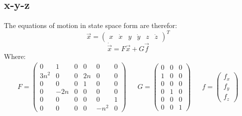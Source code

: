 \documentclass[11pt, a4paper]{article}
\begin{document}
\subsection{x-y-z}
The equations of motion in state space form are therefor:
\begin{equation}
    \vec{x} = \begin{pmatrix}
        x & \dot{x} & y & \dot{y} & z & \dot{z}
    \end{pmatrix}^T
\end{equation}
\begin{equation}
    \dot{\vec{x}}=F\vec{x}+G\vec{f}
\end{equation}
Where:
\begin{equation}
    \begin{matrix}
        F=\begin{pmatrix}
            0 & 1 & 0 & 0 & 0 & 0 \\
            3n^2 & 0 & 0 & 2n & 0 & 0 \\
            0 & 0 & 0 & 1 & 0 & 0 \\
            0 & -2n & 0 & 0 & 0 & 0 \\
            0 & 0 & 0 & 0 & 0 & 1 \\
            0 & 0 & 0 & 0 & -n^2 & 0 
        \end{pmatrix} && G=\begin{pmatrix}
            0 & 0 & 0\\
            1 & 0 & 0\\
            0 & 0 & 0\\
            0 & 1 & 0\\
            0 & 0 & 0\\
            0 & 0 & 1
        \end{pmatrix} && f=\begin{pmatrix}
            f_x\\f_y\\f_z
        \end{pmatrix}
    \end{matrix}
\end{equation}
\end{document}
